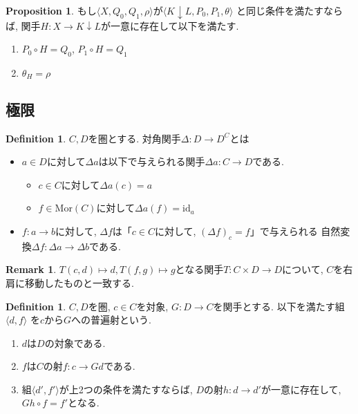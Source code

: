 \documentclass[a4paper,10pt]{article}
\theoremstyle{definition}
\newtheorem{definition}[thm]{\bfseries Definition}
\newtheorem{remark}[thm]{\bfseries Remark}    %
\newtheorem{prop}[thm]{\bfseries Proposition} %
\begin{document}
\begin{prop}
    もし$\langle X, Q_0, Q_1, \rho\rangle$が$\langle K \downarrow L, P_0, P_1, \theta \rangle$
    と同じ条件を満たすならば, 関手$H: X \rightarrow K \downarrow L$が一意に存在して以下を満たす.
    \begin{enumerate}[(1)]
        \item $P_0 \circ H = Q_0$, $P_1 \circ H = Q_1$
        \item $\theta_H=\rho$
    \end{enumerate}
\end{prop}
\subsection{極限}
\begin{definition}
    $C,D$を圏とする. 対角関手$\Delta: D \rightarrow D^{C}$とは
    \begin{itemize}
        \item $a \in D$に対して$\Delta a$は以下で与えられる関手$\Delta a: C \rightarrow D$である.
        \begin{itemize}
            \item $c \in C$に対して$\Delta a(c)=a$
            \item $f \in \textrm{Mor}(C)$に対して$\Delta a(f)=\textrm{id}_a$
        \end{itemize}
        \item $f : a \rightarrow b$に対して, $\Delta f$は「$c \in C$に対して, $(\Delta f)_c=f$」で与えられる
        自然変換$\Delta f: \Delta a \rightarrow \Delta b$である.
    \end{itemize}
\end{definition}
\begin{remark}
    $T(c,d) \mapsto d, T(f,g) \mapsto g$となる関手$T: C \times D \rightarrow D$について,
    $C$を右肩に移動したものと一致する.
\end{remark}
\begin{definition}
    $C,D$を圏, $c \in C$を対象, $G: D \rightarrow C$を関手とする. 以下を満たす組$\langle d,f\rangle$
    を$c$から$G$への普遍射という.
    \begin{enumerate}[(1)]
        \item $d$は$D$の対象である.
        \item $f$は$C$の射$f: c \rightarrow Gd$である.
        \item 組$\langle d', f' \rangle$が上2つの条件を満たすならば, $D$の射$h: d \rightarrow d'$が一意に存在して,
        $Gh \circ f=f'$となる.
    \end{enumerate}
\end{definition}
\end{document}
